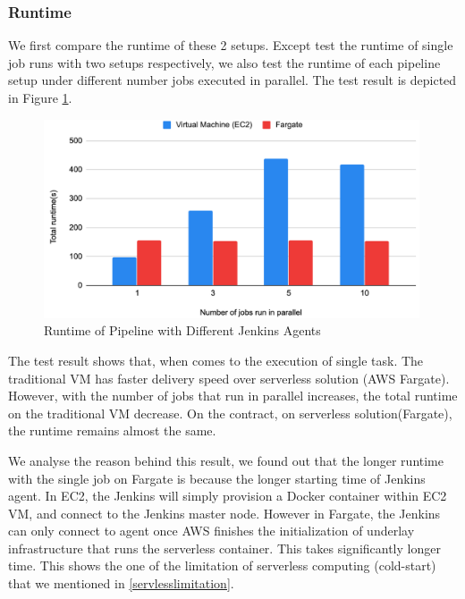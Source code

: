 \subsubsection{Runtime}
We first compare the runtime of these 2 setups. Except test the runtime of single job runs with two setups respectively, we also test the runtime of each pipeline setup under different number jobs executed in parallel. The test result is depicted in Figure \ref{fig:runtime}.
\begin{figure}[h]
    \centering
    \includegraphics[width=0.99\textwidth]{pics/runtime.png}
    \caption{Runtime of Pipeline with Different Jenkins Agents}
    \label{fig:runtime}
\end{figure}
\par
The test result shows that, when comes to the execution of single task. The traditional VM has faster delivery speed over serverless solution (AWS Fargate). However, with the number of jobs that run in parallel increases, the total runtime on the traditional VM decrease. On the contract, on serverless solution(Fargate), the runtime remains almost the same.
\par
We analyse the reason behind this result, we found out that the longer runtime with the single job on Fargate is because the longer starting time of Jenkins agent. In EC2, the Jenkins will simply provision a Docker container within EC2 VM, and connect to the Jenkins master node. However in Fargate, the Jenkins can only connect to agent once AWS finishes the initialization of underlay infrastructure that runs the serverless container. This takes significantly longer time. This shows the one of the limitation of serverless computing (cold-start) that we mentioned in \ref{servlesslimitation}.

